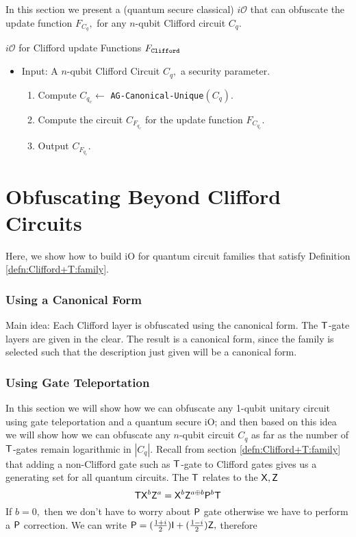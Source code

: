 In this section we present a (quantum secure classical) $i\mathcal{O}$ that can obfuscate the update function $F_{C_q},$ for any $n$-qubit Clifford circuit $C_q.$

\begin{algorithm}[H]
   \caption{$i\mathcal{O}$ for Clifford update Functions $F_{\tt Clifford}$}
  \begin{itemize}
  \item Input: A $n$-qubit Clifford Circuit $C_q,$ a security parameter.
  \begin{enumerate}
  \item Compute $C_{q_c}\leftarrow$ {\tt AG-Canonical-Unique}$(C_q).$
  \item Compute the circuit $C_{F_{q_c}}$ for the update function $F_{C_{q_c}}.$
  \item Output $C_{F_{q_c}}.$
  \end{enumerate}
  \end{itemize}
\end{algorithm}

\section{Obfuscating Beyond Clifford Circuits}
Here, we show how to build iO for quantum circuit families that satisfy Definition \ref{defn:Clifford+T:family}.

\subsubsection{Using a Canonical Form}
Main idea: Each Clifford layer is obfuscated using the canonical form. The ${\sf T}$-gate layers are given in the clear. The result is a canonical form, since the family is selected such that the description just given will be a canonical form.


\subsubsection{Using Gate Teleportation}
In this section we will show how we can obfuscate any 1-qubit unitary circuit using gate teleportation and a quantum secure iO; and then based on this idea we will show how we can obfuscate any $n$-qubit circuit $C_q$ as far as the number of ${\sf T}$-gates remain logarithmic in $|C_q|.$ Recall from  section \ref{defn:Clifford+T:family} that adding a non-Clifford gate  such as ${\sf T}$-gate to Clifford gates gives us a generating set for all quantum circuits. The ${\sf T}$ relates to the ${\sf X}, {\sf Z}$
$${\sf T} {\sf X}^b {\sf Z}^a={\sf X}^b {\sf Z}^{a\oplus b}{\sf P}^b {\sf T}$$
If $b=0,$ then we don't have to worry about ${\sf P}$ gate otherwise we have to perform a ${\sf P}$ correction. We can write ${\sf P}=(\frac{1+i}{2}) {\sf I} + (\frac{1-i}{2}){\sf Z},$ therefore

